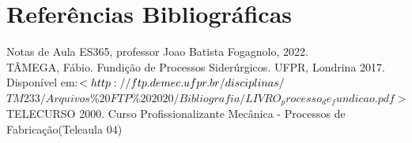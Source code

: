 \documentclass[a4paper, 12pt]{article}
\begin{document}
	
	
\newpage
\section{Referências Bibliográficas}
	Notas de Aula ES365, professor Joao Batista Fogagnolo, 2022.\\
	
	TÂMEGA, Fábio. Fundição de Processos Siderúrgicos. UFPR, Londrina 2017. \\Disponível em:$<http://ftp.demec.ufpr.br/disciplinas/\\$ $TM233/Arquivos\%20FTP\%202020/Bibliografia/LIVRO_processo_de_fundicao.pdf>$\\

	TELECURSO 2000. Curso Profissionalizante Mecânica - Processos de Fabricação(Teleaula 04)
\end{document}
